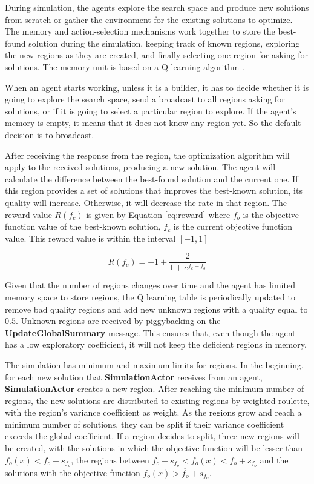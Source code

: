 \documentclass[preprint,12pt]{elsarticle}
\begin{document}
During simulation, the agents explore the search space and produce new solutions from scratch or gather the environment for the existing solutions to optimize. The memory and action-selection mechanisms work together to store the best-found solution during the simulation, keeping track of known regions, exploring the new regions as they are created, and finally selecting one region for asking for solutions. The memory unit is based on a Q-learning algorithm \cite{hasselt2010qlearning}.

When an agent starts working, unless it is a builder, it has to decide whether it is going to explore the search space, send a broadcast to all regions asking for solutions, or if it is going to select a particular region to explore. If the agent's memory is empty, it means that it does not know any region yet. So the default decision is to broadcast. 

After receiving the response from the region, the optimization algorithm will apply to the received solutions, producing a new solution. The agent will calculate the difference between the best-found solution and the current one. If this region provides a set of solutions that improves the best-known solution, its quality will increase. Otherwise, it will decrease the rate in that region. The reward value $R(f_c)$ is given by Equation \ref{eq:reward} where $f_b$ is the objective function value of the best-known solution, $f_c$ is the current objective function value. This reward value is within the interval $[-1, 1]$

\begin{equation}
\label{eq:reward}
    R(f_c) = -1 + \frac{2}{1 + e^{f_c - f_b}}
\end{equation}

Given that the number of regions changes over time and the agent has limited memory space to store regions, the Q learning table is periodically updated to remove bad quality regions and add new unknown regions with a quality equal to $0.5$. Unknown regions are received by piggybacking on the \textbf{UpdateGlobalSummary} message. This ensures that, even though the agent has a low exploratory coefficient, it will not keep the deficient regions in memory.

The simulation has minimum and maximum limits for regions. In the beginning, for each new solution that \textbf{SimulationActor} receives from an agent, \textbf{ SimulationActor } creates a new region. After reaching the minimum number of regions, the new solutions are distributed to existing regions by weighted roulette, with the region's variance coefficient as weight. As the regions grow and reach a minimum number of solutions, they can be split if their variance coefficient exceeds the global coefficient. If a region decides to split, three new regions will be created, with the solutions in which the objective function will be lesser than $f_o(x) < \overline{f_o} - s_{f_o}$, the regions between $\overline{f_o} - s_{f_o} < f_o(x) < \overline{f_o} + s_{f_o}$  and the solutions with the objective function $f_o(x) > \overline{f_o} + s_{f_o}$.
\end{document}
